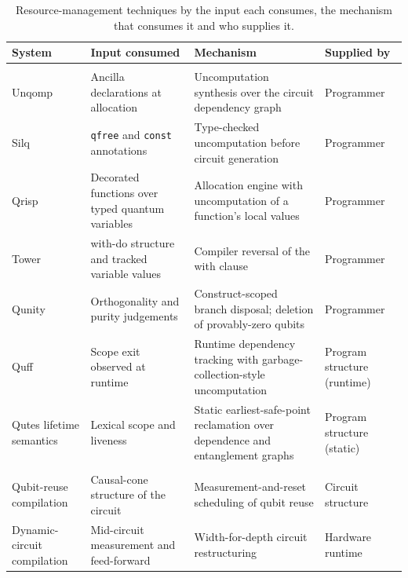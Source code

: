 \begin{table}[htbp]
    \centering
    \caption{Resource-management techniques by the input each consumes, the mechanism that consumes it and who supplies it.}
    \label{tab:lit_rev:compilation:resource_techniques}
    \small
    \begin{tabularx}{\textwidth}{@{}>{\hsize=0.18\hsize}X>{\hsize=0.28\hsize}X>{\hsize=0.32\hsize}X>{\hsize=0.22\hsize}X@{}}
		\toprule
        \textbf{System} & \textbf{Input consumed} & \textbf{Mechanism} & \textbf{Supplied by} \\ \midrule
        \multicolumn{4}{@{}l}{\textit{Local, coherence-preserving}} \\
        \addlinespace
        Unqomp & Ancilla declarations at allocation & Uncomputation synthesis over the circuit dependency graph & Programmer \\
        Silq & \texttt{qfree} and \texttt{const} annotations & Type-checked uncomputation before circuit generation & Programmer \\
        Qrisp & Decorated functions over typed quantum variables & Allocation engine with uncomputation of a function's local values & Programmer \\
        Tower & with-do structure and tracked variable values & Compiler reversal of the with clause & Programmer \\
        Qunity & Orthogonality and purity judgements & Construct-scoped branch disposal; deletion of provably-zero qubits & Programmer \\
        Quff & Scope exit observed at runtime & Runtime dependency tracking with garbage-collection-style uncomputation & Program structure (runtime) \\
        Qutes lifetime semantics & Lexical scope and liveness & Static earliest-safe-point reclamation over dependence and entanglement graphs & Program structure (static) \\ \midrule
        \multicolumn{4}{@{}l}{\textit{Global, measurement-based}} \\
        \addlinespace
        Qubit-reuse compilation & Causal-cone structure of the circuit & Measurement-and-reset scheduling of qubit reuse & Circuit structure \\
        Dynamic-circuit compilation & Mid-circuit measurement and feed-forward & Width-for-depth circuit restructuring & Hardware runtime \\ \bottomrule
    \end{tabularx}
\end{table}

